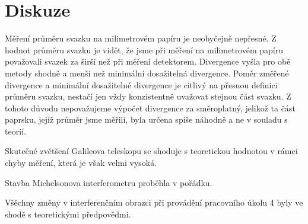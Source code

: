 \section*{Diskuze}
Měření průměru svazku na milimetrovém papíru je neobyčejně nepřesné. Z hodnot průměru svazku je vidět, že jsme při měření na milimetrovém papíru považovali svazek za širší než při měření detektorem. Divergence vyšla pro obě metody shodně a menší než minimální dosažitelná divergence. Poměr změřené divergence a minimální dosažitelné divergence je citlivý na přesnou definici průměru svazku, nestačí jen vždy konzistentně uvažovat stejnou část svazku.
Z tohoto důvodu nepovažujeme výpočet divergence za směroplatný, jelikož ta část paprsku, jejíž průměr jsme měřili, byla určena spíše náhodně a ne v souladu s teorií.

Skutečné zvětšení Galileova teleskopu se shoduje s teoretickou hodnotou v rámci chyby měření, která je však velmi vysoká.

Stavba Michelsonova interferometru proběhla v pořádku.

Všěchny změny v interferenčním obrazci při provádění pracovního úkolu 4 byly ve shodě s teoretickými předpovědmi.